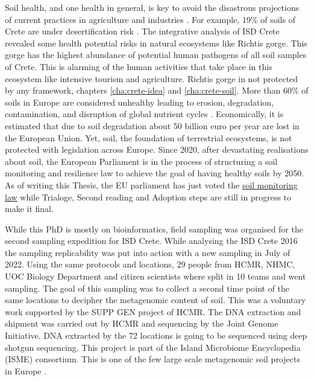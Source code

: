 Soil health,
and one health in general, is key to avoid the disastrous projections of
current practices in agriculture and industries \parencite{banerjee2023Soil}.
For example, 19\% of soils of Crete are under desertification risk \parencite{KARAMESOUTI2018266}.
The integrative analysis of ISD Crete revealed some health potential risks in 
natural ecosystems like Richtis gorge. This gorge has the highest abundance of 
potential human pathogens of all soil samples of Crete. This is alarming of 
the human activities that take place in this ecosystem like intensive tourism 
and agriculture. Richtis gorge in not protected by any framework, chapters \ref{cha:crete-idea} and \ref{cha:crete-soil}.
More than 60\% of
soils in Europe are considered unhealthy leading to erosion, degradation, contamination,
and disruption of global nutrient cycles \parencite{commission2020caring}.
Economically, it is estimated that due to soil degradation about 50 billion euro per year
are lost in the European Union. 
Yet, soil, the foundation of 
terrestrial ecosystems, is not protected with legislation across Europe.
Since 2020, after devastating realisations about soil, the European Parliament 
is in the process of structuring a soil monitoring and resilience law to achieve 
the goal of having healthy soils by 2050. As of writing this Thesis, the EU 
parliament has just voted the \href{https://www.europarl.europa.eu/thinktank/en/document/EPRS_BRI(2024)757627}{soil monitoring law}
while Trialoge, Second reading and Adoption steps are still in progress to make it final.

While this PhD is mostly on bioinformatics, field sampling was organised
for the second sampling expedition for ISD Crete.
While analysing the ISD Crete 2016 the sampling replicability was put into action with a 
new sampling in July of 2022.
Using the same protocols and locations, 29 people from HCMR, NHMC, UOC Biology
Department and citizen scientists where split in 10 teams and went sampling. 
The goal of this sampling was to collect a second time point of the same locations
to decipher the metagenomic content of soil. This was a voluntary work supported 
by the SUPP GEN project of HCMR. The DNA extraction and shipment was carried out 
by HCMR and sequencing by the Joint Genome Initiative. DNA extracted by the 72 locations 
is going to be sequenced using deep shotgun sequencing. 
This project is part of the Island Microbiome Encyclopedia (ISME) consortium.
This is one of the few large scale metagenomic soil projects in
Europe \parencite{nayfach2021a-genomic, ma2023a-genomic}.

